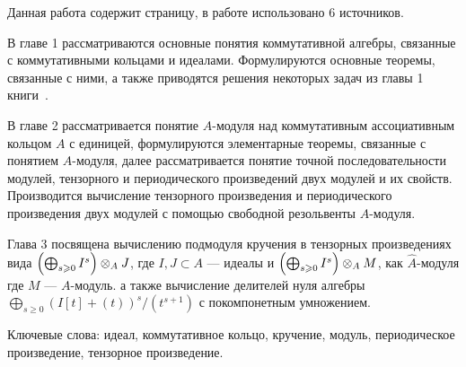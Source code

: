     Данная работа содержит \pageref{LastPage} страницу, в работе использовано 6 источников.

    В главе 1 рассматриваются основные понятия коммутативной алгебры, связанные с коммутативными
    кольцами и идеалами. Формулируются основные теоремы, связанные с ними, а также приводятся 
    решения некоторых задач из главы 1 книги~\cite{A-M}. 

    В главе 2 рассматривается понятие $A$-модуля 
    над коммутативным ассоциативным кольцом $A$ с единицей, формулируются элементарные теоремы, связанные с понятием $A$-модуля, далее
    рассматривается понятие точной последовательности модулей, тензорного и периодического 
    произведений двух модулей и их свойств. Производится вычисление тензорного произведения 
    и периодического произведения двух модулей  с помощью свободной резольвенты $A$-модуля. 
    
    Глава 3 посвящена вычислению подмодуля кручения в тензорных произведениях вида 
    $\left(\bigoplus_{s \geqslant 0} I^s \right) \otimes_A J$, где $I, J \subset A$ --- идеалы и 
    $\left(\bigoplus_{s \geqslant 0} I^s \right) \otimes_A M$, как $\hat A$-модуля где $M$ --- $A$-модуль.
    а также вычисление делителей нуля алгебры 
    $\bigoplus_{s \geq 0}{(I[t] + (t))^s / (t^{s + 1})}$ с покомпонетным умножением.

    Ключевые слова: идеал,
    коммутативное кольцо,
    кручение,
    модуль,
    периодическое произведение,
    тензорное произведение.
    

